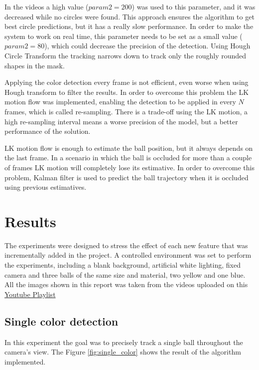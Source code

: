 \documentclass[10pt,twocolumn,letterpaper]{article}
\begin{document}
In the videos a high value ($param2 = 200$) was used to this parameter, and it was decreased while no circles were found. This approach ensures the algorithm to get best circle predictions, but it has a really slow performance. In order to make the system to work on real time, this parameter needs to be set as a small value ($param2 = 80$), which could decrease the precision of the detection. Using Hough Circle Transform the tracking narrows down to track only the roughly rounded shapes in the mask.

Applying the color detection every frame is not efficient, even worse when using
Hough transform to filter the results. In order to overcome this problem the LK
motion flow was implemented, enabling the detection to be applied  in every $N$
frames, which is called re-sampling. There is a trade-off using the LK motion,
a high re-sampling interval means a worse precision of the model, but a better
performance of the solution.

LK motion flow is enough to estimate the ball position, but it always depends on
the last frame. In a scenario in which the ball is occluded for more than a
couple of frames  LK motion will completely lose its estimative. In order to
overcome this problem, Kalman filter is used to predict the ball trajectory
when it is occluded using previous estimatives.

\section{Results}\label{sec:result}

The experiments were designed to stress the effect of each new feature that was incrementally added in the project. A controlled environment was set to perform the experiments, including a blank background, artificial white lighting, fixed camera and three balls of the same size and material, two yellow and one blue. All the images shown in this report was taken from the videos uploaded on this \href{https:\/\/www.youtube.com\/playlist?list=PLK4X-xqdmWaKhqpoLLpr7LF9g5MUMJaY\_}{Youtube Playlist}

\subsection{Single color detection}

In this experiment the goal was to precisely track a single ball throughout the camera's view. The Figure \ref{fig:single_color} shows the result of the algorithm implemented.
\end{document}
